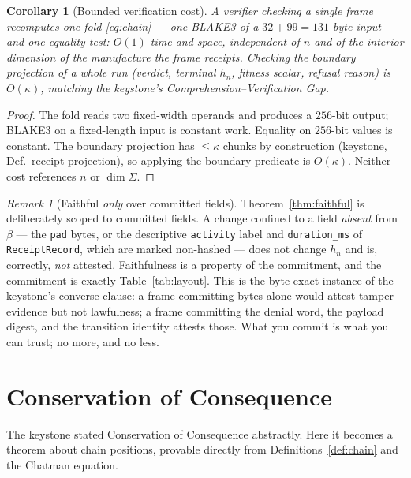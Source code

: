 \documentclass[11pt,oneside]{book}
\theoremstyle{definition}
\theoremstyle{plain}
\newtheorem{corollary}[theorem]{Corollary}
\theoremstyle{remark}
\newtheorem*{remark}{Remark}
\newcommand{\CL}{\kappa}                       %
\newcommand{\body}{\beta}                       %
\newcommand{\code}[1]{\texttt{#1}}
\newcommand{\Sig}{\Sigma}                       %
\begin{document}
\begin{corollary}[Bounded verification cost]\label{cor:cost}
A verifier checking a single frame recomputes one fold \eqref{eq:chain} --- one BLAKE3 of a
$32+99=131$-byte input --- and one equality test: $O(1)$ time and space, independent of $n$
and of the interior dimension of the manufacture the frame receipts. Checking the boundary
projection of a whole run (verdict, terminal $h_n$, fitness scalar, refusal reason) is
$O(\CL)$, matching the keystone's Comprehension--Verification Gap.
\end{corollary}

\begin{proof}
The fold reads two fixed-width operands and produces a $256$-bit output; BLAKE3 on a
fixed-length input is constant work. Equality on $256$-bit values is constant. The boundary
projection has $\le\CL$ chunks by construction (keystone, Def.\ receipt projection), so
applying the boundary predicate is $O(\CL)$. Neither cost references $n$ or $\dim\Sig$.
\end{proof}

\begin{remark}[Faithful \emph{only} over committed fields]
Theorem~\ref{thm:faithful} is deliberately scoped to committed fields. A change confined to a
field \emph{absent} from $\body$ --- the \code{pad} bytes, or the descriptive
\code{activity} label and \code{duration\_ms} of \code{ReceiptRecord}, which are marked
non-hashed --- does not change $h_n$ and is, correctly, \emph{not} attested. Faithfulness is a
property of the commitment, and the commitment is exactly Table~\ref{tab:layout}. This is the
byte-exact instance of the keystone's converse clause: a frame committing bytes alone would
attest tamper-evidence but not lawfulness; a frame committing the denial word, the payload
digest, and the transition identity attests those. What you commit is what you can trust; no
more, and no less.
\end{remark}

\chapter{Conservation of Consequence}
\label{ch:conservation}

The keystone stated Conservation of Consequence abstractly. Here it becomes a theorem about
chain positions, provable directly from Definitions~\ref{def:chain} and the Chatman equation.
\end{document}
